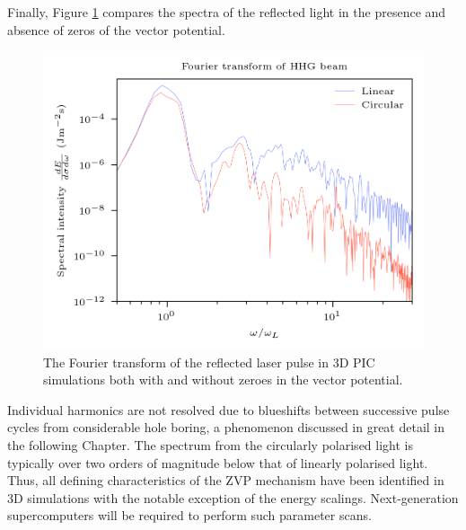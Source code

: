 Finally, Figure \ref{fig:zvphhgbeamfourier} compares the spectra of the reflected light in the presence and absence of zeros of the vector potential.
\begin{figure}
	\centering
	\includegraphics[width=0.7\linewidth]{figures/zvp/zvp_hhg_beam_fourier}
	\caption[The Fourier transform of the reflected laser pulse in 3D PIC simulations.]{The Fourier transform of the reflected laser pulse in 3D PIC simulations both with and without zeroes in the vector potential.}
	\label{fig:zvphhgbeamfourier}
\end{figure}
Individual harmonics are not resolved due to blueshifts between successive pulse cycles from considerable hole boring, a phenomenon discussed in great detail in the following Chapter. The spectrum from the circularly polarised light is typically over two orders of magnitude below that of linearly polarised light. Thus, all defining characteristics of the ZVP mechanism have been identified in 3D simulations with the notable exception of the energy scalings. Next-generation supercomputers will be required to perform such parameter scans.

